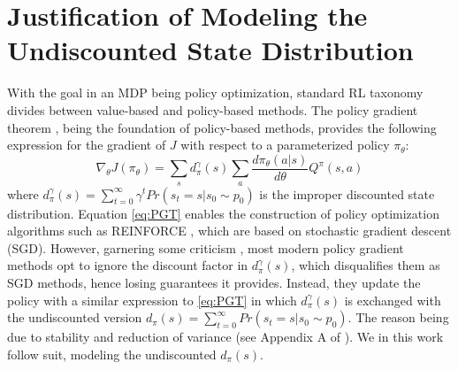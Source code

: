 
\section{Justification of Modeling the Undiscounted State Distribution}\label{appendix:undiscounted}
With the goal in an MDP being policy optimization, standard RL taxonomy divides between value-based and policy-based methods. The policy gradient theorem \cite{sutton2000policy}, being the foundation of policy-based methods, provides the following expression for the gradient of $J$ with respect to a parameterized policy $\pi_\theta$: 
\begin{equation}\label{eq:PGT}
\nabla_\theta J(\pi_\theta) = \sum_s d^\gamma_{\pi}(s) \sum_a \frac{d\pi_\theta(a|s)}{d\theta} Q^\pi(s,a)
\end{equation}
where $d^\gamma_{\pi}(s) = \sum_{t=0}^{\infty}\gamma^t Pr(s_t = s | s_0 \sim p_0)$ is the improper discounted state distribution. Equation \eqref{eq:PGT} enables the construction of policy optimization algorithms such as REINFORCE \cite{sutton2018reinforcement}, which are based on stochastic gradient descent (SGD). However, garnering some criticism \cite{nota2019policy}, most modern policy gradient methods \cite{schulman2017proximal,fujimoto2018addressing,haarnoja2018soft} opt to ignore the discount factor in $d^\gamma_\pi(s)$, which disqualifies them as SGD methods, hence losing guarantees it provides. Instead, they update the policy with a similar expression to \eqref{eq:PGT} in which $d^\gamma_\pi(s)$ is exchanged with the undiscounted version $d_{\pi}(s) = \sum_{t=0}^{\infty}Pr(s_t = s | s_0 \sim p_0).$  The reason being due to stability and reduction of variance (see Appendix A of \cite{haarnoja2018soft}). We in this work follow suit, modeling the undiscounted $d_{\pi}(s)$.

